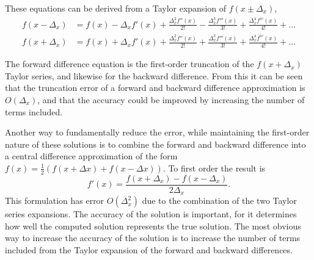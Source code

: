 \documentclass[a4paper,12pt,fourier,authoryear,custommargin]{Classes/PhDThesisPSnPDF}
\begin{document}
These equations can be derived from a Taylor expansion of $f(x\pm\Delta_{x})$,
\begin{align}
f(x-\Delta_{x}) & = f(x)-\Delta_{x}f'(x)+\frac{\Delta_{x}^{2}f''(x)}{2!}-\frac{\Delta_{x}^{3}f'''(x)}{3!}+\frac{\Delta_{x}^{4}f^{iv}(x)}{4!}+...\label{eq:TaylorForward}\\
f(x+\Delta_{x}) & = f(x)+\Delta_{x}f'(x)+\frac{\Delta_{x}^{2}f''(x)}{2!}+\frac{\Delta_{x}^{3}f'''(x)}{3!}+\frac{\Delta_{x}^{4}f^{iv}(x)}{4!}+...\label{eq:TaylorBackward}
\end{align}


The forward difference equation is the first-order truncation of the $f(x+\Delta_{x})$ Taylor series, and likewise for the backward difference.
From this it can be seen that the truncation error of a forward and backward difference approximation is $O(\Delta_{x})$, and that the accuracy could be improved by increasing the number of terms included.

Another way to fundamentally reduce the error, while maintaining the first-order nature of these solutions is to combine the forward and backward difference into a central difference approximation of the form  $f(x)=\frac{1}{2} \left(f(x + \Delta x) + f(x - \Delta x)\right)$.
To first order the result is 
\begin{equation}
f'(x)=\frac{f(x+\Delta_{x})-f(x-\Delta_{x})}{2\Delta_{x}}.\label{eq:First Order CD}
\end{equation}
This formulation has error $O(\Delta_{x}^{2})$ due to the combination of the two Taylor series expansions.
The accuracy of the solution is important, for it determines how well the computed solution represents the true solution.
The most obvious way to increase the accuracy of the solution is to increase the number of terms included from the Taylor expansion of the forward and backward differences.
\end{document}
